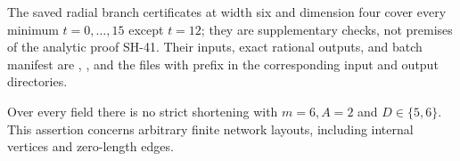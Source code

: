The saved radial branch certificates at width six and
dimension four cover every minimum $t=0,\ldots,15$
except $t=12$; they are supplementary checks, not
premises of the analytic proof SH-41.  Their inputs,
exact rational outputs, and batch manifest are
,
,
and the files with prefix
 in the corresponding
input and output directories.

\begin{theorem}
\label{thm:width-six-dimensions-five-six}
Over every field there is no strict shortening with
$m=6,A=2$ and $D\in\{5,6\}$.  This assertion concerns
arbitrary finite network layouts, including internal
vertices and zero-length edges.
\end{theorem}

